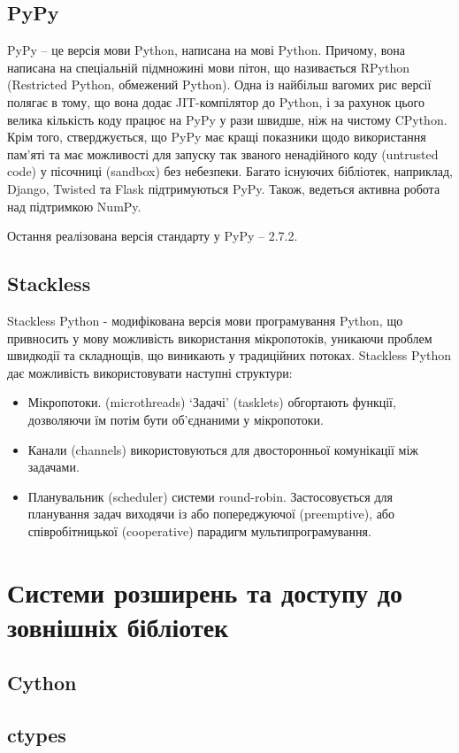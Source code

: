 \documentclass[a4paper, 12pt]{article}
\begin{document}
\subsection{PyPy}
PyPy -- це версія мови Python, написана на мові Python. Причому, вона написана на спеціальній 
підмножині мови пітон, що називається RPython (Restricted Python, обмежений Python). Одна 
із найбільш вагомих рис версії полягає в тому, що вона додає JIT-компілятор до Python, і за 
рахунок цього велика кількість коду працює на PyPy у рази швидше, ніж на чистому CPython. 
Крім того, стверджується, що PyPy має кращі показники щодо використання пам'яті та має 
можливості для запуску так званого ненадійного коду (untrusted code) у пісочниці (sandbox) 
без небезпеки. Багато існуючих бібліотек, наприклад, Django, Twisted та Flask підтримуються 
PyPy. Також, ведеться активна робота над підтримкою NumPy.

Остання реалізована версія стандарту у PyPy -- 2.7.2.

\subsection{Stackless}
Stackless Python - модифікована версія мови програмування Python, що привносить у мову
можливість використання мікропотоків, уникаючи проблем швидкодії та складнощів, що виникають
у традиційних потоках. Stackless Python дає можливість використовувати наступні структури:
\begin{itemize}
    \item Мікропотоки. (microthreads) `Задачі' (tasklets) обгортають функції, дозволяючи їм 
          потім бути об'єднаними у мікропотоки.
    \item Канали (channels) використовуються для двосторонньої комунікації між задачами.
    \item Планувальник (scheduler) системи round-robin. Застосовується для планування
          задач виходячи із або попереджуючої (preemptive), або співробітницької (cooperative) 
          парадигм мультипрограмування.
\end{itemize}

\section{Системи розширень та доступу до зовнішніх бібліотек}

\subsection{Cython}

\subsection{ctypes}
\end{document}
